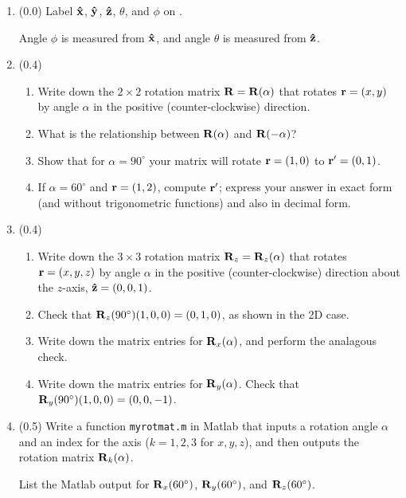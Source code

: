 \documentclass[11pt,titlepage,fleqn]{article}
\newcommand{\rotangA}{\alpha}
\begin{document}
\begin{enumerate}

\item (0.0) Label $\mbox{\boldmath{$\hat{\rm x}$}}$, $\mbox{\boldmath{$\hat{\rm y}$}}$, $\mbox{\boldmath{$\hat{\rm z}$}}$, $\theta$, and $\phi$ on .

Angle $\phi$ is measured from $\mbox{\boldmath{$\hat{\rm x}$}}$, and angle $\theta$ is measured from $\mbox{\boldmath{$\hat{\rm z}$}}$.

\item (0.4) 

\begin{enumerate}
\item Write down the $2 \times 2$ rotation matrix $\bR = \bR(\rotangA)$ that rotates $\mbox{${\bf r}$} = (x,y)$ by angle $\rotangA$ in the positive (counter-clockwise) direction.
\item What is the relationship between $\bR(\rotangA)$ and $\bR(-\rotangA)$?
\item Show that for $\rotangA = 90^\circ$ your matrix will rotate $\mbox{${\bf r}$} = (1,0)$ to $\mbox{${\bf r}$}' = (0,1)$.
\item If $\rotangA = 60^\circ$ and $\mbox{${\bf r}$} = (1,2)$, compute $\mbox{${\bf r}$}'$; express your answer in exact form (and without trigonometric functions) and also in decimal form.
\end{enumerate}

\item (0.4)

\begin{enumerate}
\item Write down the $3 \times 3$ rotation matrix $\bR_z = \bR_z(\rotangA)$ that rotates $\mbox{${\bf r}$} = (x,y,z)$ by angle $\rotangA$ in the positive (counter-clockwise) direction about the $z$-axis, $\mbox{\boldmath{$\hat{\rm z}$}} = (0,0,1)$.
\item Check that $\mbox{${\bf R}$}_z(90^\circ)(1,0,0) = (0,1,0)$, as shown in the 2D case.
\item Write down the matrix entries for $\bR_x(\rotangA)$, and perform the analagous check.
\item Write down the matrix entries for $\bR_y(\rotangA)$. Check that $\mbox{${\bf R}$}_y(90^\circ)(1,0,0) = (0,0,-1)$.
\end{enumerate}

\item (0.5) Write a function \verb+myrotmat.m+ in Matlab that inputs a rotation angle $\rotangA$ and an index for the axis ($k = 1,2,3$ for $x,y,z$), and then outputs the rotation matrix $\bR_k(\rotangA)$. 

List the Matlab output for $\mbox{${\bf R}$}_x(60^\circ)$, $\mbox{${\bf R}$}_y(60^\circ)$, and $\mbox{${\bf R}$}_z(60^\circ)$.


\end{enumerate}
\end{document}
